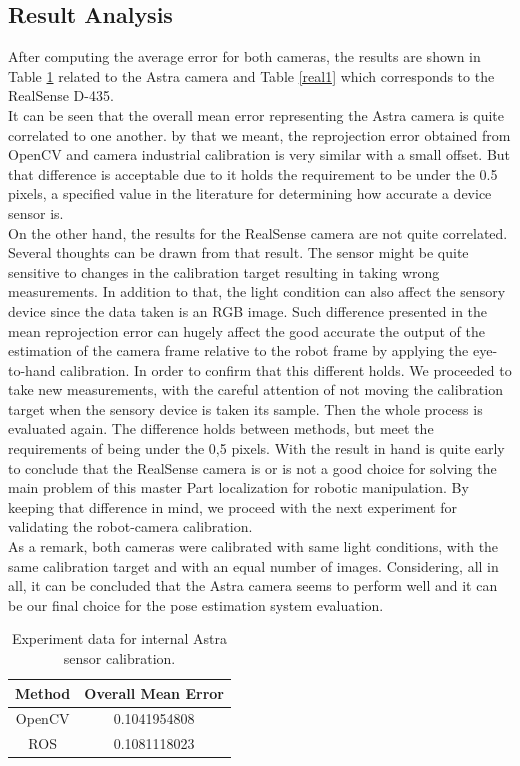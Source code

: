\subsection{Result Analysis}
After computing the average error for both cameras, the results are shown in Table \ref{astra1} related to the Astra camera and Table \ref{real1} which corresponds to the RealSense D-435.\\
 It can be seen that the overall mean error representing the Astra camera is quite correlated to one another. by that we meant, the reprojection error obtained from OpenCV and camera \textunderscore industrial calibration is very similar with a small offset. But that difference is acceptable due to it holds the requirement to be under the 0.5 pixels, a specified value in the literature for determining how accurate a device sensor is. \\
On the other hand, the results for the RealSense camera are not quite correlated. Several thoughts can be drawn from that result. The sensor might be quite sensitive to changes in the calibration target resulting in taking wrong measurements. In addition to that, the light condition can also affect the sensory device since the data taken is an RGB image. Such difference presented in the mean reprojection error can hugely affect the good accurate the output of the estimation of the camera frame relative to the robot frame by applying the eye-to-hand calibration. In order to confirm that this different holds. We proceeded to take new measurements, with the careful attention of not moving the calibration target when the sensory device is taken its sample. Then the whole process is evaluated again. The difference holds between methods, but meet the requirements of being under the 0,5 pixels. With the result in hand is quite early to conclude that the RealSense camera is or is not a good choice for solving the main problem of this master Part localization for robotic manipulation. By keeping that difference in mind, we proceed with the next experiment for validating the robot-camera calibration.  \\
As a remark, both cameras were calibrated with same light conditions, with the same calibration target and with an equal number of images. Considering, all in all, it can be concluded that the Astra camera seems to perform well and it can be our final choice for the pose estimation system evaluation. 


\begin{table}[b]
\renewcommand{\arraystretch}{1.3}
\caption{Experiment data for internal Astra sensor calibration.}
\label{astra1}
\centering
\begin{tabular}{|c||c|}
\hline
Method & Overall Mean Error\\
\hline
OpenCV &  0.1041954808\\
\hline
ROS &  0.1081118023\\
\hline
\hline
\end{tabular}
\end{table}

